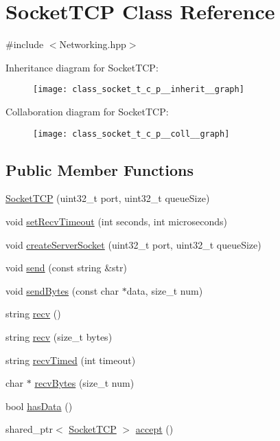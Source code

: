 \hypertarget{class_socket_t_c_p}{\section{Socket\-T\-C\-P Class Reference}
\label{class_socket_t_c_p}
}


{\ttfamily \#include $<$Networking.\-hpp$>$}



Inheritance diagram for Socket\-T\-C\-P\-:
\nopagebreak
\begin{figure}[H]
\begin{center}
\leavevmode
\texttt{[image: class\_socket\_t\_c\_p\_\_inherit\_\_graph]}
\end{center}
\end{figure}


Collaboration diagram for Socket\-T\-C\-P\-:
\nopagebreak
\begin{figure}[H]
\begin{center}
\leavevmode
\texttt{[image: class\_socket\_t\_c\_p\_\_coll\_\_graph]}
\end{center}
\end{figure}
\subsection*{Public Member Functions}
\begin{DoxyCompactItemize}
\item 
\hyperlink{class_socket_t_c_p_a03fa65da98287c442592f6602087703f}{Socket\-T\-C\-P} (uint32\-\_\-t port, uint32\-\_\-t queue\-Size)
\item 
void \hyperlink{class_socket_t_c_p_a473fa103469c9b83720b4f8ecfde1298}{set\-Recv\-Timeout} (int seconds, int microseconds)
\item 
void \hyperlink{class_socket_t_c_p_a51b9d8a8c461f357ec72244570c69e5c}{create\-Server\-Socket} (uint32\-\_\-t port, uint32\-\_\-t queue\-Size)
\item 
void \hyperlink{class_socket_t_c_p_a853ec6fc95a21f49186829a72321cdc8}{send} (const string \&str)
\item 
void \hyperlink{class_socket_t_c_p_a1e0a19b3511099febd41579d578efd9b}{send\-Bytes} (const char $\ast$data, size\-\_\-t num)
\item 
string \hyperlink{class_socket_t_c_p_af0fcc6b415f4395f4d45db073f898319}{recv} ()
\item 
string \hyperlink{class_socket_t_c_p_a8b18cd843ab049c46cba3d6a6d2a0de8}{recv} (size\-\_\-t bytes)
\item 
string \hyperlink{class_socket_t_c_p_ad0488313f286b1583e300fc39004db97}{recv\-Timed} (int timeout)
\item 
char $\ast$ \hyperlink{class_socket_t_c_p_a429d26df00424eb1776cce33207b6b47}{recv\-Bytes} (size\-\_\-t num)
\item 
bool \hyperlink{class_socket_t_c_p_a0ef19d204316995c6e1943f6894f82c3}{has\-Data} ()
\item 
shared\-\_\-ptr$<$ \hyperlink{class_socket_t_c_p}{Socket\-T\-C\-P} $>$ \hyperlink{class_socket_t_c_p_a4a895bc95518aa10f02d476e88465809}{accept} ()
\end{DoxyCompactItemize}


